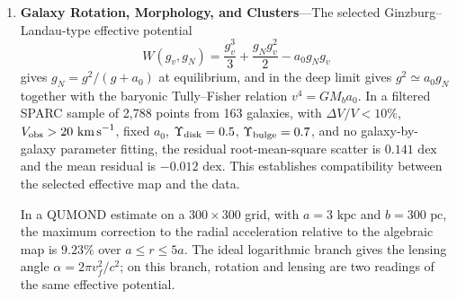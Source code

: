 \documentclass[11pt,a4paper]{article}
\begin{document}
\begin{enumerate}[label=\arabic*.]
\item \textbf{Galaxy Rotation, Morphology, and Clusters}---The selected Ginzburg--Landau-type effective potential
\[
W(g_v,g_N)=\frac{g_v^3}{3}+\frac{g_Ng_v^2}{2}-a_0g_Ng_v
\]
gives $g_N=g^2/(g+a_0)$ at equilibrium, and in the deep limit gives $g^2\simeq a_0g_N$ together with the baryonic Tully--Fisher relation $v^4=GM_ba_0$. In a filtered SPARC sample of 2,788 points from 163 galaxies, with $\Delta V/V<10\%$, $V_{\rm obs}>20\text{ km\,s}^{-1}$, fixed $a_0$, $\Upsilon_{\rm disk}=0.5$, $\Upsilon_{\rm bulge}=0.7$, and no galaxy-by-galaxy parameter fitting, the residual root-mean-square scatter is $0.141\text{ dex}$ and the mean residual is $-0.012\text{ dex}$. This establishes compatibility between the selected effective map and the data.

In a QUMOND estimate on a $300\times300$ grid, with $a=3\text{ kpc}$ and $b=300\text{ pc}$, the maximum correction to the radial acceleration relative to the algebraic map is $9.23\%$ over $a\le r\le5a$. The ideal logarithmic branch gives the lensing angle $\alpha=2\pi v_f^2/c^2$; on this branch, rotation and lensing are two readings of the same effective potential.


\end{enumerate}
\end{document}
